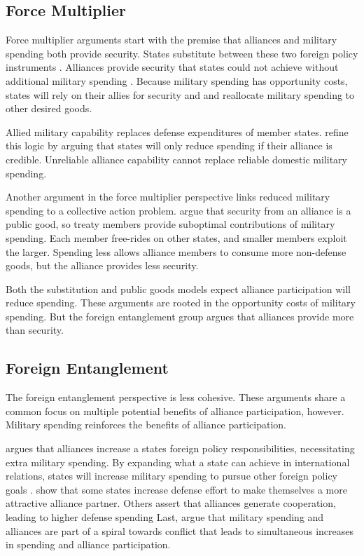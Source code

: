 \documentclass[12pt]{article}
\begin{document}
\subsection{Force Multiplier} 


Force multiplier arguments start with the premise that alliances and military spending both provide security.
States substitute between these two foreign policy instruments \citep{MostStarr1989}.  
Alliances provide security that states could not achieve without additional military spending \citep{Morrow1993, Conybeare1994}. 
Because military spending has opportunity costs, states will rely on their allies for security and and reallocate military spending to other desired goods. 


Allied military capability replaces defense expenditures of member states. 
\citet{DigiuseppePoast2016} refine this logic by arguing that states will only reduce spending if their alliance is credible. 
Unreliable alliance capability cannot replace reliable domestic military spending. 


Another argument in the force multiplier perspective links reduced military spending to a collective action problem. 
\citet{OlsonZeckhauser1966} argue that security from an alliance is a public good, so treaty members provide suboptimal contributions of military spending. 
Each member free-rides on other states, and smaller members exploit the larger. 
Spending less allows alliance members to consume more non-defense goods, but the alliance provides less security. 


Both the substitution and public goods models expect alliance participation will reduce spending. 
These arguments are rooted in the opportunity costs of military spending. 
But the foreign entanglement group argues that alliances provide more than security. 


\subsection{Foreign Entanglement}


The foreign entanglement perspective is less cohesive.
These arguments share a common focus on multiple potential benefits of alliance participation, however. 
Military spending reinforces the benefits of alliance participation. 


\citet{Diehl1994} argues that alliances increase a states foreign policy responsibilities, necessitating extra military spending. 
By expanding what a state can achieve in international relations, states will increase military spending to pursue other foreign policy goals \citep{MorganPalmer2006}. 
\citet{Horowitzetal2017} show that some states increase defense effort to make themselves a more attractive alliance partner. 
Others assert that alliances generate cooperation, leading to higher defense spending \citep{Palmer1990, QuirozFlores2011}
Last, \citet{SeneseVasquez2008} argue that military spending and alliances are part of a spiral towards conflict that leads to simultaneous increases in spending and alliance participation. 
\end{document}

